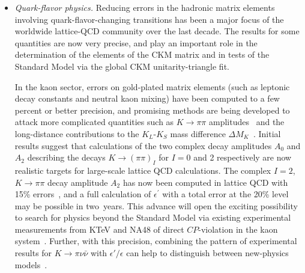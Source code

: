 \begin{itemize}

\item {\it Quark-flavor physics.} Reducing errors in the hadronic matrix
elements involving quark-flavor-changing transitions has been a major focus of
the worldwide lattice-QCD community over the last decade.  The results for
some quantities are now very precise, and play an important role in the
determination of the elements of the CKM matrix and in tests of the Standard
Model via the global CKM unitarity-triangle fit.

In the kaon sector, errors on gold-plated matrix elements (such as leptonic
decay constants and neutral kaon mixing) have been computed to a few percent
or better precision, and promising methods are being developed to attack more
complicated quantities such as $K\to\pi\pi$
amplitudes~\cite{Blum:2011pu,Blum:2011ng,Blum:2012uk} and the long-distance
contributions to the $K_L$-$K_S$ mass difference $\Delta
M_K$~\cite{Yu:2011np,Christ:2012se}.  Initial results suggest that
calculations of the two complex decay amplitudes $A_0$ and $A_2$ describing
the decays $K\to(\pi\pi)_I$ for $I=0$ and 2 respectively are now realistic
targets for large-scale lattice QCD calculations.  The complex $I=2$,
$K\to\pi\pi$ decay amplitude $A_2$ has now been computed in lattice QCD with
15\% errors~\cite{Blum:2011ng,Blum:2012uk}, and a full calculation of
$\epsilon^\prime$ with a total error at the 20\% level may be possible in
two~years.  This advance will open the exciting possibility to search for
physics beyond the Standard Model via existing experimental measurements from
KTeV and NA48 of direct $CP$-violation in the kaon
system~\cite{Batley:2002gn,Abouzaid:2010ny}.  Further, with this precision,
combining the pattern of experimental results for $K\to\pi\nu\bar\nu$ with
$\epsilon'/\epsilon$ can help to distinguish between new-physics
models~\cite{Buras:1999da,Kronfeld:2013uoa}.


\end{itemize}
